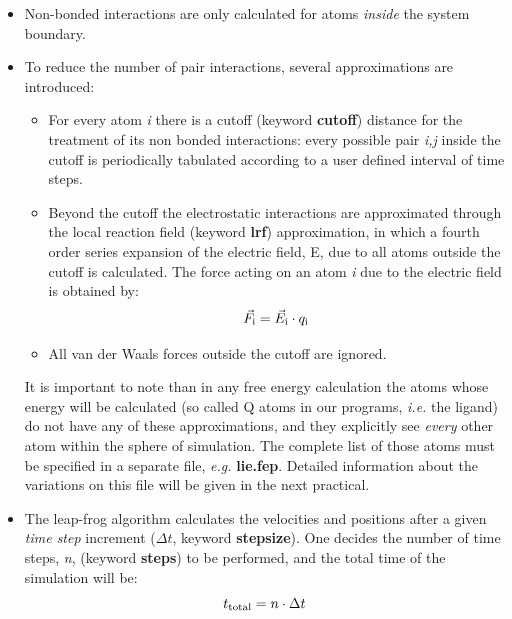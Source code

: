 \documentclass[a4paper,12pt]{article}
\begin{document}
\begin {itemize}
\item Non-bonded interactions are only calculated for atoms {\it inside} the system boundary.
\item To reduce the number of pair interactions, several approximations are introduced:
\begin {itemize}
\item For every atom {\it i} there is a cutoff (keyword {\bf cutoff}) distance for the treatment of its non bonded interactions: every possible pair {\it i,j} inside the cutoff is periodically tabulated according to a user defined interval of time steps.
\item Beyond the cutoff the electrostatic interactions are approximated through the local reaction field (keyword {\bf lrf}) approximation, in which a fourth order series expansion of the electric field, E, due to all atoms outside the cutoff is calculated. The force acting on an atom {\it i} due to the electric field is obtained by: $$\vec F_{\rm i} = \vec E_{\rm i} \cdot q_{\rm i}$$
\item All van der Waals forces outside the cutoff are ignored.
\end {itemize}
It is important to note than in any free energy calculation the
atoms whose energy will be calculated (so called Q atoms in our
programs, {\it i.e.} the ligand) do not have any of these
approximations, and they explicitly see {\it every} other atom
within the sphere of simulation. The complete list of those atoms
must be specified in a separate file, {\it e.g.} {\bf lie.fep}.
Detailed information about the variations on this file will be
given in the next practical.
\item The leap-frog algorithm calculates the velocities and positions after a given {\it time step} increment ($\Delta t$, keyword {\bf stepsize}). One decides the number of time steps, {\it n}, (keyword {\bf steps}) to be performed, and the total time of the simulation will be: $$ t_{\rm total} = n \cdot \Delta t$$
\end {itemize}


%
%
\end{document}
